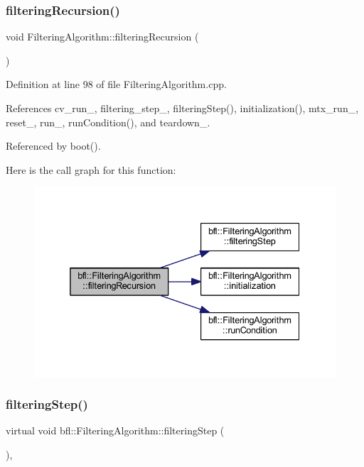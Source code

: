 \subsubsection{\texorpdfstring{filtering\+Recursion()}{filteringRecursion()}}
{\footnotesize\ttfamily void Filtering\+Algorithm\+::filtering\+Recursion (\begin{DoxyParamCaption}{ }\end{DoxyParamCaption})\hspace{0.3cm}{\ttfamily [private]}}



Definition at line 98 of file Filtering\+Algorithm.\+cpp.



References cv\+\_\+run\+\_\+, filtering\+\_\+step\+\_\+, filtering\+Step(), initialization(), mtx\+\_\+run\+\_\+, reset\+\_\+, run\+\_\+, run\+Condition(), and teardown\+\_\+.



Referenced by boot().

Here is the call graph for this function\+:
\nopagebreak
\begin{figure}[H]
\begin{center}
\leavevmode
\includegraphics[width=332pt]{classbfl_1_1FilteringAlgorithm_a139fe290f73939e72c88cb43c8ef7544_cgraph}
\end{center}
\end{figure}
\mbox{\label{classbfl_1_1FilteringAlgorithm_ab3bceb43b5810a4bf1da884b8a0b145a}} 
\subsubsection{\texorpdfstring{filtering\+Step()}{filteringStep()}}
{\footnotesize\ttfamily virtual void bfl\+::\+Filtering\+Algorithm\+::filtering\+Step (\begin{DoxyParamCaption}{ }\end{DoxyParamCaption})\hspace{0.3cm}{\ttfamily [protected]}, {}}



